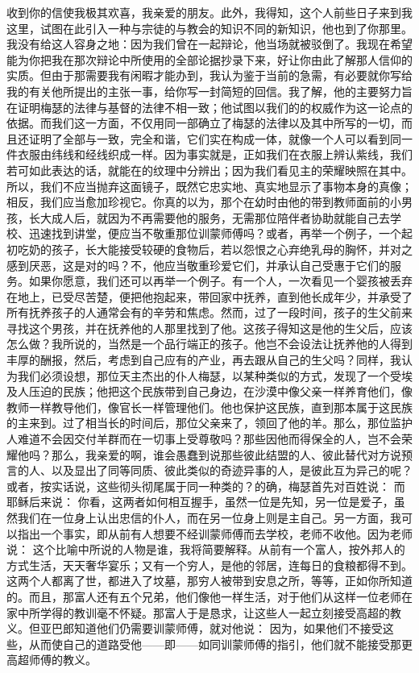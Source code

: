 收到你的信使我极其欢喜，我亲爱的朋友。此外，我得知，这个人前些日子来到我这里，试图在此引入一种与宗徒的与教会的知识不同的新知识，他也到了你那里。我没有给这人容身之地：因为我们曾在一起辩论，他当场就被驳倒了。我现在希望能为你把我在那次辩论中所使用的全部论据抄录下来，好让你由此了解那人信仰的实质。但由于那需要我有闲暇才能办到，我认为鉴于当前的急需，有必要就你写给我的有关他所提出的主张一事，给你写一封简短的回信。我了解，他的主要努力旨在证明梅瑟的法律与基督的法律不相一致；他试图以我们的的权威作为这一论点的依据。而我们这一方面，不仅用同一部确立了梅瑟的法律以及其中所写的一切，而且还证明了全部与一致，完全和谐，它们实在构成一体，就像一个人可以看到同一件衣服由纬线和经线织成一样。因为事实就是，正如我们在衣服上辨认紫线，我们若可如此表达的话，就能在的纹理中分辨出；因为我们看见主的荣耀映照在其中。所以，我们不应当抛弃这面镜子，既然它忠实地、真实地显示了事物本身的真像；相反，我们应当愈加珍视它。你真的以为，那个在幼时由他的带到教师面前的小男孩，长大成人后，就因为不再需要他的服务，无需那位陪伴者协助就能自己去学校、迅速找到讲堂，便应当不敬重那位训蒙师傅吗？或者，再举一个例子，一个起初吃奶的孩子，长大能接受较硬的食物后，若以怨恨之心弃绝乳母的胸怀，并对之感到厌恶，这是对的吗？不，他应当敬重珍爱它们，并承认自己受惠于它们的服务。如果你愿意，我们还可以再举一个例子。有一个人，一次看见一个婴孩被丢弃在地上，已受尽苦楚，便把他抱起来，带回家中抚养，直到他长成年少，并承受了所有抚养孩子的人通常会有的辛劳和焦虑。然而，过了一段时间，孩子的生父前来寻找这个男孩，并在抚养他的人那里找到了他。这孩子得知这是他的生父后，应该怎么做？我所说的，当然是一个品行端正的孩子。他岂不会设法让抚养他的人得到丰厚的酬报，然后，考虑到自己应有的产业，再去跟从自己的生父吗？同样，我认为我们必须设想，那位天主杰出的仆人梅瑟，以某种类似的方式，发现了一个受埃及人压迫的民族；他把这个民族带到自己身边，在沙漠中像父亲一样养育他们，像教师一样教导他们，像官长一样管理他们。他也保护这民族，直到那本属于这民族的主来到。过了相当长的时间后，那位父亲来了，领回了他的羊。那么，那位监护人难道不会因交付羊群而在一切事上受尊敬吗？那些因他而得保全的人，岂不会荣耀他吗？那么，我亲爱的啊，谁会愚蠢到说那些彼此结盟的人、彼此替代对方说预言的人、以及显出了同等同质、彼此类似的奇迹异事的人，是彼此互为异己的呢？或者，按实话说，这些彻头彻尾属于同一种类的？的确，梅瑟首先对百姓说： 而耶稣后来说： 你看，这两者如何相互握手，虽然一位是先知，另一位是爱子，虽然我们在一位身上认出忠信的仆人，而在另一位身上则是主自己。另一方面，我可以指出一个事实，即从前有人想要不经训蒙师傅而去学校，老师不收他。因为老师说： 这个比喻中所说的人物是谁，我将简要解释。从前有一个富人，按外邦人的方式生活，天天奢华宴乐；又有一个穷人，是他的邻居，连每日的食粮都得不到。这两个人都离了世，都进入了坟墓，那穷人被带到安息之所，等等，正如你所知道的。而且，那富人还有五个兄弟，他们像他一样生活，对于他们从这样一位老师在家中所学得的教训毫不怀疑。那富人于是恳求，让这些人一起立刻接受高超的教义。但亚巴郎知道他们仍需要训蒙师傅，就对他说： 因为，如果他们不接受这些，从而使自己的道路受他——即——如同训蒙师傅的指引，他们就不能接受那更高超师傅的教义。\par


